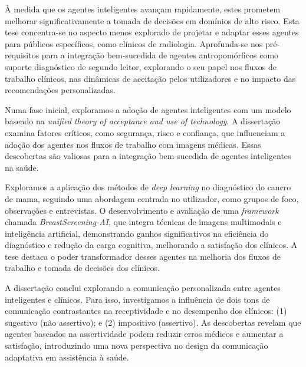 
\`{A} medida que os agentes inteligentes avan\c{c}am rapidamente, estes prometem melhorar significativamente a tomada de decis\~{o}es em dom\'{i}nios de alto risco.
Esta tese concentra-se no aspecto menos explorado de projetar e adaptar esses agentes para p\'{u}blicos espec\'{i}ficos, como cl\'{i}nicos de radiologia.
Aprofunda-se nos pr\'{e}-requisitos para a integra\c{c}\~{a}o bem-sucedida de agentes antropom\'{o}rficos como suporte diagn\'{o}stico de segundo leitor, explorando o seu papel nos fluxos de trabalho cl\'{i}nicos, nas din\^{a}micas de aceita\c{c}\~{a}o pelos utilizadores e no impacto das recomenda\c{c}\~{o}es personalizadas.

Numa fase inicial, exploramos a ado\c{c}\~{a}o de agentes inteligentes com um modelo baseado na {\it unified theory of acceptance and use of technology}.
A disserta\c{c}\~{a}o examina fatores cr\'{i}ticos, como seguran\c{c}a, risco e confian\c{c}a, que influenciam a ado\c{c}\~{a}o dos agentes nos fluxos de trabalho com imagens m\'{e}dicas.
Essas descobertas s\~{a}o valiosas para a integra\c{c}\~{a}o bem-sucedida de agentes inteligentes na sa\'{u}de.

Exploramos a aplica\c{c}\~{a}o dos m\'{e}todos de {\it deep learning} no diagn\'{o}stico do cancro de mama, seguindo uma abordagem centrada no utilizador, como grupos de foco, observa\c{c}\~{o}es e entrevistas.
O desenvolvimento e avalia\c{c}\~{a}o de uma {\it framework} chamada \textit{BreastScreening-AI}, que integra t\'{e}cnicas de imagens multimodais e intelig\^{e}ncia artificial, demonstrando ganhos significativos na efici\^{e}ncia do diagn\'{o}stico e redu\c{c}\~{a}o da carga cognitiva, melhorando a satisfa\c{c}\~{a}o dos cl\'{i}nicos.
A tese destaca o poder transformador desses agentes na melhoria dos fluxos de trabalho e tomada de decis\~{o}es dos cl\'{i}nicos.

A disserta\c{c}\~{a}o conclui explorando a comunica\c{c}\~{a}o personalizada entre agentes inteligentes e cl\'{i}nicos.
Para isso, investigamos a influ\^{e}ncia de dois tons de comunica\c{c}\~{a}o contrastantes na receptividade e no desempenho dos cl\'{i}nicos:
(1) sugestivo (n\~{a}o assertivo); e
(2) impositivo (assertivo).
As descobertas revelam que agentes baseados na assertividade podem reduzir erros m\'{e}dicos e aumentar a satisfa\c{c}\~{a}o, introduzindo uma nova perspectiva no design da comunica\c{c}\~{a}o adaptativa em assist\^{e}ncia \`{a} sa\'{u}de.

